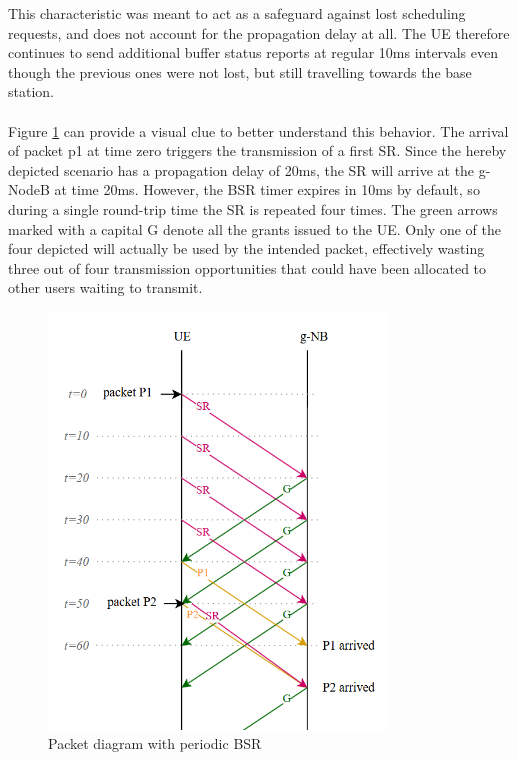 This characteristic was meant to act as a safeguard against lost scheduling requests, and does not account for the propagation delay at all. The \ac{UE} therefore continues to send additional buffer status reports at regular 10ms intervals even though the previous ones were not lost, but still travelling towards the base station.

\paragraph{}
Figure \ref{fig:diagram-wasted-capacity} can provide a visual clue to better understand this behavior. The arrival of packet p1 at time zero triggers the transmission of a first \ac{SR}. Since the hereby depicted scenario has a propagation delay of 20ms, the \ac{SR} will arrive at the g-NodeB at time 20ms. However, the \ac{BSR} timer expires in 10ms by default, so during a single round-trip time the \ac{SR} is repeated four times. The green arrows marked with a capital G denote all the grants issued to the \ac{UE}. Only one of the four depicted will actually be used by the intended packet, effectively wasting three out of four transmission opportunities that could have been allocated to other users waiting to transmit.

\begin{figure}[ht]
    \centering
    \includegraphics[width=0.8\textwidth]{res/diagram-wasted-grants.png}
    \caption{Packet diagram with periodic \ac{BSR}}
    \label{fig:diagram-wasted-capacity}
\end{figure}

